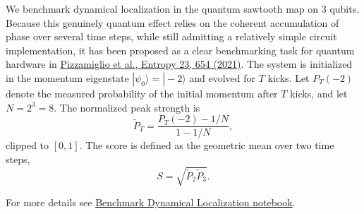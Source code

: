 We benchmark dynamical localization in the quantum sawtooth map on 3 qubits.
Because this genuinely quantum effect relies on the coherent accumulation of phase over several time steps, while still admitting a relatively simple circuit implementation, it has been proposed as a clear benchmarking task for quantum hardware in \href{https://arxiv.org/abs/2105.10813}{Pizzamiglio et al., Entropy 23, 654 (2021)}. The system is initialized in the momentum eigenstate \(|\psi_0\rangle = |-2\rangle\) and evolved for \(T\) kicks. Let \(P_T(-2)\) denote the measured probability of the initial momentum after \(T\) kicks, and let \(N=2^3=8\). The normalized peak strength is
\[
\tilde{P}_T = \frac{P_T(-2) - 1/N}{1 - 1/N},
\]
clipped to \([0,1]\). The score is defined as the geometric mean over two time steps,
\[
S = \sqrt{\tilde{P}_2 \tilde{P}_3}.
\]
\smallskip

For more details see \href{https://github.com/Classiq/classiq-library/tree/main/benchmarking/benchmarks/benchmark\_dynamical\_localization.ipynb}{Benchmark Dynamical Localization notebook}.
\medskip
